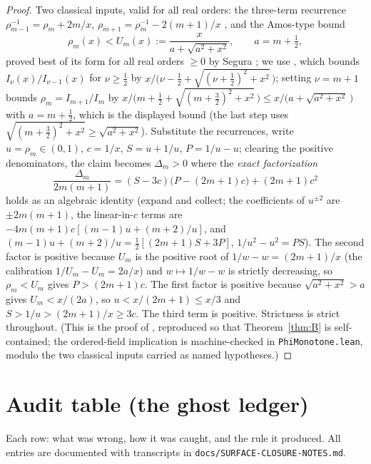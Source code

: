 \documentclass[11pt]{article}
\theoremstyle{remark}
\begin{document}
\begin{proof}
Two classical inputs, valid for all real orders: the three-term
recurrence $\rho_{m-1}^{-1}=\rho_m+2m/x$, $\rho_{m+1}=\rho_m^{-1}
-2(m+1)/x$ \cite[10.29.1]{DLMF}, and the Amos-type bound
\[
\rho_m(x)<U_m(x):=\frac{x}{a+\sqrt{a^2+x^2}},\qquad a=m+\tfrac12,
\]
proved best of its form for all real orders $\ge0$ by Segura
\cite{Segura2011}; we use \cite[Thm.~2]{RuizSegura}, which bounds
$I_\nu(x)/I_{\nu-1}(x)$ for $\nu\ge\tfrac12$ by
$x/\bigl(\nu-\tfrac12+\sqrt{(\nu+\tfrac12)^2+x^2}\,\bigr)$; setting
$\nu=m+1$ bounds $\rho_m=I_{m+1}/I_m$ by
$x/\bigl(m+\tfrac12+\sqrt{(m+\tfrac32)^2+x^2}\,\bigr)
\le x/\bigl(a+\sqrt{a^2+x^2}\,\bigr)$ with $a=m+\tfrac12$, which is the
displayed bound (the last step uses $\sqrt{(m+\tfrac32)^2+x^2}\ge
\sqrt{a^2+x^2}$).
Substitute the recurrences, write $u=\rho_m\in(0,1)$, $c=1/x$,
$S=u+1/u$, $P=1/u-u$; clearing the positive denominators, the claim
becomes $\Delta_m>0$ where the \emph{exact factorization}
\[
\frac{\Delta_m}{2m(m+1)}=(S-3c)\bigl(P-(2m+1)c\bigr)+(2m+1)c^2
\]
holds as an algebraic identity (expand and collect; the coefficients of
$u^{\pm2}$ are $\pm2m(m+1)$, the linear-in-$c$ terms are
$-4m(m+1)c[(m-1)u+(m+2)/u]$, and $(m-1)u+(m+2)/u=\tfrac12[(2m+1)S+3P]$,
$1/u^2-u^2=PS$). The second factor is positive because $U_m$ is the
positive root of $1/w-w=(2m+1)/x$ (the calibration $1/U_m-U_m=2a/x$) and
$w\mapsto1/w-w$ is strictly decreasing, so $\rho_m<U_m$ gives
$P>(2m+1)c$. The first factor is positive because $\sqrt{a^2+x^2}>a$
gives $U_m<x/(2a)$, so $u<x/(2m+1)\le x/3$ and
$S>1/u>(2m+1)/x\ge3c$. The third term is positive. Strictness is strict
throughout. \textup{(}This is the proof of \cite{PhiLemma}, reproduced
so that Theorem~\ref{thm:B} is self-contained; the ordered-field
implication is machine-checked in \texttt{PhiMonotone.lean}, modulo the
two classical inputs carried as named hypotheses.\textup{)}
\end{proof}

\section{Audit table (the ghost ledger)}\label{app:ghosts}

Each row: what was wrong, how it was caught, and the rule it produced.
All entries are documented with transcripts in
\texttt{docs/SURFACE-CLOSURE-NOTES.md}.
\end{document}
